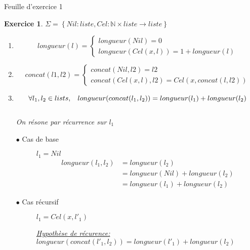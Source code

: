 \documentclass{article}
\theoremstyle{plain}
\newtheorem{exo}{Exercice}%
\begin{document}
\begin{center}
\large\sc Feuille d'exercice 1
\end{center}

\begin{exo}
   $ \Sigma = \left\{Nil : liste, 
   Cel : \mathbb{N} \times liste \rightarrow liste\right\}$

\begin{enumerate}
\item 
    \[ longueur (l) =
    \begin{cases}
    longueur(Nil) = 0 \\
    longueur(Cel(x, l)) = 1 + longueur(l)
    \end{cases}
    \]
        
\item 
    \[ concat (l1, l2) =
    \begin{cases}
    concat(Nil, l2) = l2 \\
    concat(Cel(x, l), l2) = Cel(x, concat(l, l2))
    \end{cases}
    \]
        
\item
    \begin{equation*}
        \forall l_1, l_2 \in lists,\hspace{3mm} 
        longueur(concat(l_1, l_2)) = longueur(l_1) + longueur(l_2) 
    \end{equation*}
        \vspace{3mm} \\
        On résone par récurrence sur $l_1$

    \begin{description}
    \item[$\bullet$ Cas de base] $l_1 = Nil$
        \begin{align*} 
            longueur(l_1, l_2) &= longueur(l_2) \\
                               &= longueur(Nil) + longueur(l_2) \\
                               &= longueur(l_1) + longueur(l_2) 
        \end{align*}
    \item[$\bullet$ Cas récursif] $l_1 = Cel(x, l'_1)$ 
                
        \underline{Hypothèse de récurence:} $longueur(concat(l'_1, l_2)) = 
                                        longueur(l'_1) + longueur(l_2)$
                

\end{description}
\end{enumerate}
\end{exo}
\end{document}
